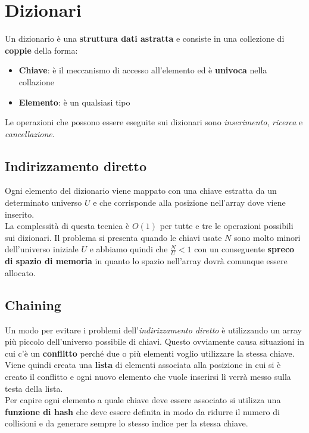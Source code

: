 \newpage
\section{Dizionari}
\begin{definition}
	Un dizionario è una \textbf{struttura dati astratta} e consiste in una collezione di \textbf{coppie} della forma:
	\begin{itemize}
		\item \textbf{Chiave}: è il meccanismo di accesso all'elemento ed è \textbf{univoca} nella collazione
		\item \textbf{Elemento}:  è un qualsiasi tipo
	\end{itemize} 
\end{definition}
Le operazioni che possono essere eseguite sui dizionari sono \emph{inserimento}, \emph{ricerca} e \emph{cancellazione}.
\subsection{Indirizzamento diretto}
Ogni elemento del dizionario viene mappato con una chiave estratta da un determinato universo $U$ e che corrisponde alla posizione nell'array dove viene inserito. \\
La complessità di questa tecnica è $O(1)$ per tutte e tre le operazioni possibili sui dizionari. Il problema si presenta quando le chiavi usate $N$ sono molto minori dell'universo iniziale $U$ e abbiamo quindi che $\frac{N}{U} < 1$ con un conseguente \textbf{spreco di spazio di memoria} in quanto lo spazio nell'array dovrà comunque essere allocato.
\subsection{Chaining}
Un modo per evitare i problemi dell'\emph{indirizzamento diretto} è utilizzando un array più piccolo dell'universo possibile di chiavi. Questo ovviamente causa situazioni in cui c'è un \textbf{conflitto} perché due o più elementi voglio utilizzare la stessa chiave. Viene quindi creata una \textbf{lista} di elementi associata alla posizione in cui si è creato il conflitto e ogni nuovo elemento che vuole inserirsi lì verrà messo sulla testa della lista. \\
Per capire ogni elemento a quale chiave deve essere associato si utilizza una \textbf{funzione di hash} che deve essere definita in modo da ridurre il numero di collisioni e da generare sempre lo stesso indice per la stessa chiave.
